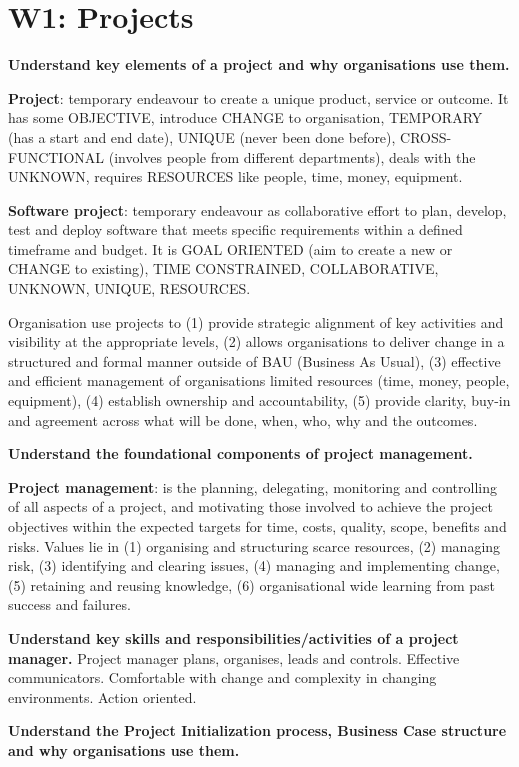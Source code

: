 \section{W1: Projects}

\textbf{Understand key elements of a project and why organisations use them.}

\textbf{Project}: temporary endeavour to create a unique product, service or outcome. It has some OBJECTIVE, introduce CHANGE to organisation, TEMPORARY (has a start and end date), UNIQUE (never been done before), CROSS-FUNCTIONAL (involves people from different departments), deals with the UNKNOWN, requires RESOURCES like people, time, money, equipment.

\textbf{Software project}: temporary endeavour as collaborative effort to plan, develop, test and deploy software that meets specific requirements within a defined timeframe and budget. It is GOAL ORIENTED (aim to create a new or CHANGE to existing), TIME CONSTRAINED, COLLABORATIVE, UNKNOWN, UNIQUE, RESOURCES.

Organisation use projects to (1) provide strategic alignment of key activities and visibility at the appropriate levels, (2) allows organisations to deliver change in a structured and formal manner outside of BAU (Business As Usual), (3) effective and efficient management of organisations limited resources (time, money, people, equipment), (4) establish ownership and accountability, (5) provide clarity, buy-in and agreement across what will be done, when, who, why and the outcomes.

\textbf{Understand the foundational components of project management.}

\textbf{Project management}: is the planning, delegating, monitoring and controlling of all aspects of a project, and motivating those involved to achieve the project objectives within the expected targets for time, costs, quality, scope, benefits and risks. Values lie in (1) organising and structuring scarce resources, (2) managing risk, (3) identifying and clearing issues, (4) managing and implementing change, (5) retaining and reusing knowledge, (6) organisational wide learning from past success and failures.

\textbf{Understand key skills and responsibilities/activities of a project manager.}
Project manager plans, organises, leads and controls. Effective communicators. Comfortable with change and complexity in changing environments. Action oriented.

\textbf{Understand the Project Initialization process, Business Case structure and why organisations use them.}

